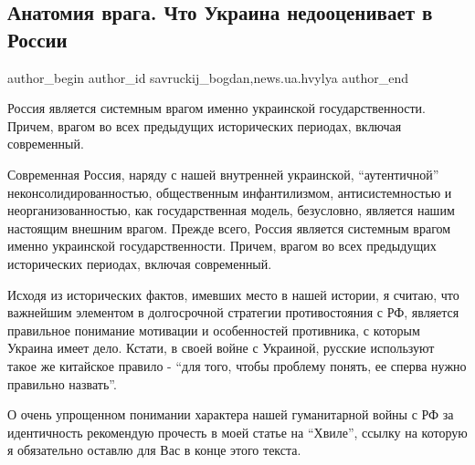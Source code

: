  
 
 
 
 
\subsection{Анатомия врага. Что Украина недооценивает в России}
\label{sec:16_01_2022.stz.news.ua.hvylya.1.anatomia_vraga}

\ifcmt
 author_begin
   author_id savruckij_bogdan,news.ua.hvylya
 author_end
\fi

\begin{zznagolos}
Россия является системным врагом именно украинской государственности. Причем,
врагом во всех предыдущих исторических периодах, включая современный.
\end{zznagolos}


Современная Россия, наряду с нашей внутренней украинской, \enquote{аутентичной}
неконсолидированностью, общественным инфантилизмом, антисистемностью и
неорганизованностью, как государственная модель, безусловно, является нашим
настоящим внешним врагом. Прежде всего, Россия является системным врагом именно
украинской государственности. Причем, врагом во всех предыдущих исторических
периодах, включая современный.

Исходя из исторических фактов, имевших место в нашей истории, я считаю, что
важнейшим элементом в долгосрочной стратегии противостояния с РФ, является
правильное понимание мотивации и особенностей противника, с которым Украина
имеет дело. Кстати, в своей войне с Украиной, русские используют такое же
китайское правило - \enquote{для того, чтобы проблему понять, ее сперва нужно
правильно назвать}.

О очень упрощенном понимании характера нашей гуманитарной войны с РФ за
идентичность рекомендую прочесть в моей статье на \enquote{Хвиле}, ссылку на
которую я обязательно оставлю для Вас в конце этого текста.
